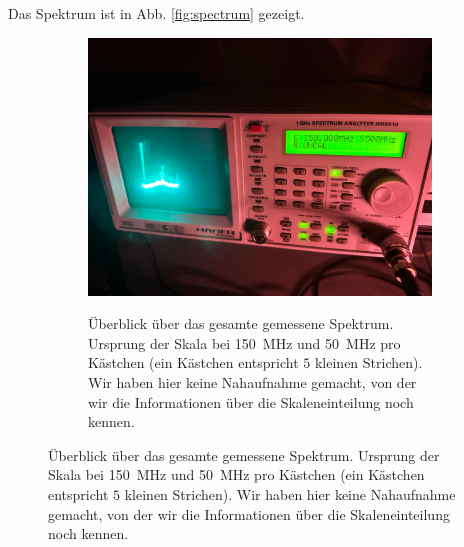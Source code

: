 \documentclass{article}
\begin{document}
Das Spektrum ist in Abb. \ref{fig:spectrum} gezeigt.
\begin{figure}[h]
  \centering
  \begin{subfigure}{0.49\textwidth}
    \centering
    \includegraphics[width=\textwidth,trim={0 15cm 0 21cm},clip=true]{spectrum0}
    \label{fig:spectrum0}
    \caption{Überblick über das gesamte gemessene Spektrum. Ursprung der Skala bei \SI{150}{\MHz} und \SI{50}{\MHz}
      pro Kästchen (ein Kästchen entspricht $5$ kleinen Strichen).
      Wir haben hier keine Nahaufnahme gemacht, von der wir die Informationen über die Skaleneinteilung noch kennen.}
  \end{subfigure}
  


\end{figure}
\end{document}
